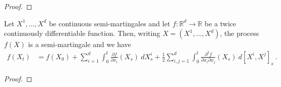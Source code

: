 \begin{proof}

\end{proof}


\begin{theorem}\label{thm:Ito_formula}
Let $X^1, \ldots, X^d$ be continuous semi-martingales and let $f : \mathbb{R}^d \to \mathbb{R}$ be a twice continuously differentiable function.
Then, writing $X = (X^1, \ldots, X^d)$, the process $f(X)$ is a semi-martingale and we have
\begin{align*}
  f(X_t)
  &= f(X_0)
  + \sum_{i=1}^d \int_0^t \frac{\partial f}{\partial x_i}(X_s) \: dX^i_s
  + \frac{1}{2} \sum_{i,j=1}^d \int_0^t \frac{\partial^2 f}{\partial x_i \partial x_j}(X_s) \: d[X^i, X^j]_s
  \: .
\end{align*}
\end{theorem}

\begin{proof}

\end{proof}
